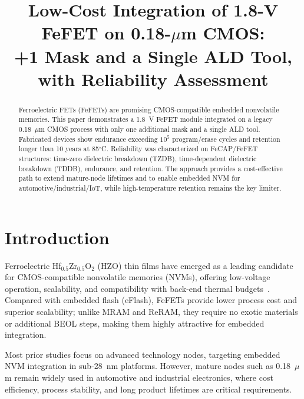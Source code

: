 \documentclass[conference]{IEEEtran}
\begin{document}
\title{Low-Cost Integration of 1.8-V FeFET on 0.18-$\mu$m CMOS:\\
+1 Mask and a Single ALD Tool, with Reliability Assessment}

\author{
}

\maketitle

\begin{abstract}
Ferroelectric FETs (FeFETs) are promising CMOS-compatible embedded nonvolatile memories.
This paper demonstrates a 1.8~V FeFET module integrated on a legacy 0.18~$\mu$m CMOS process with only one additional mask and a single ALD tool.
Fabricated devices show endurance exceeding $10^5$ program/erase cycles and retention longer than 10 years at 85$^\circ$C.
Reliability was characterized on FeCAP/FeFET structures: time-zero dielectric breakdown (TZDB), time-dependent dielectric breakdown (TDDB), endurance, and retention.
The approach provides a cost-effective path to extend mature-node lifetimes and to enable embedded NVM for automotive/industrial/IoT, while high-temperature retention remains the key limiter.
\end{abstract}

\section{Introduction}
Ferroelectric Hf$_{0.5}$Zr$_{0.5}$O$_2$ (HZO) thin films have emerged as a leading candidate for CMOS-compatible nonvolatile memories (NVMs), 
offering low-voltage operation, scalability, and compatibility with back-end thermal budgets~\cite{boscke2011,mueller2012,mikolajick2019,mueller2015}.
Compared with embedded flash (eFlash), FeFETs provide lower process cost and superior scalability; 
unlike MRAM and ReRAM, they require no exotic materials or additional BEOL steps, making them highly attractive for embedded integration.

Most prior studies focus on advanced technology nodes, targeting embedded NVM integration in sub-28~nm platforms. 
However, mature nodes such as 0.18~$\mu$m remain widely used in automotive and industrial electronics, 
where cost efficiency, process stability, and long product lifetimes are critical requirements.  
\end{document}
